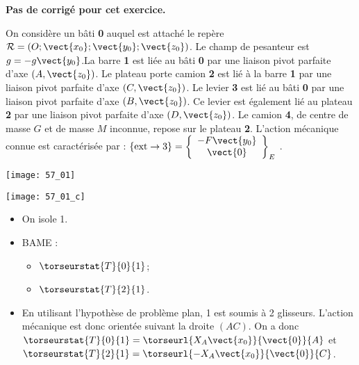 \normalfalse \difficiletrue \tdifficilefalse
\correctiontrue


\setcounter{numques}{0}
\ifcorrection
\else
\textbf{Pas de corrigé pour cet exercice.}
\fi

\ifprof
\else
On considère un bâti \textbf{0} auquel est attaché le repère$\mathcal{R}=\left(O;\vect{x_0};\vect{y_0};\vect{z_0} \right)$. Le champ de pesanteur est $g=-g\vect{y_0}$.La barre \textbf{1} est liée au bâti \textbf{0} par une liaison pivot parfaite d’axe $\left(A,\vect{z_0}\right)$. Le plateau porte camion \textbf{2} est lié à la barre \textbf{1} par une liaison pivot parfaite d’axe $\left(C,\vect{z_0}\right)$. Le levier \textbf{3} est lié au bâti \textbf{0} par une liaison pivot parfaite d’axe $\left(B,\vect{z_0}\right)$. Ce levier est également lié au plateau \textbf{2} par une liaison pivot parfaite d’axe $\left(D,\vect{z_0}\right)$. Le camion \textbf{4}, de centre de masse $G$ et de masse $M$ inconnue, repose sur le plateau \textbf{2}.
L’action mécanique connue est caractérisée par : $\{\text{ext}\rightarrow 3\}=\left\{
\begin{array}{c}
-F\vect{y_0} \\
\vect{0} \\
\end{array}
\right\}_E$ .


\begin{center}
\texttt{[image: 57\_01]}
\end{center}


\fi

\ifprof
\begin{center}
\texttt{[image: 57\_01\_c]}
\end{center}
\else
\fi



\ifprof
\begin{itemize}
\item On isole 1.
\item BAME :
\begin{itemize}
\item $\torseurstat{T}{0}{1}$;
\item $\torseurstat{T}{2}{1}$.
\end{itemize}
\item En utilisant l'hypothèse de problème plan, 1 est soumis à 2 glisseurs. L'action mécanique est donc orientée suivant la droite $(AC)$. 
On a donc 
$\torseurstat{T}{0}{1} = \torseurl{X_A\vect{x_0}}{\vect{0}}{A}$ et 
$\torseurstat{T}{2}{1} = \torseurl{-X_A\vect{x_0}}{\vect{0}}{C}$.

\end{itemize}
\else
\fi


